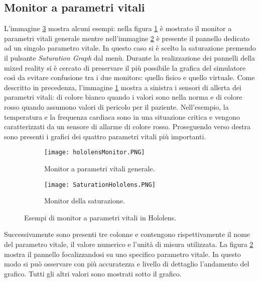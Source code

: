 \subsection{Monitor a parametri vitali}
L'immagine \ref{pic:example-hololens} mostra alcuni esempi: nella figura \ref{pic:monitor-hololens} è mostrato il monitor a parametri vitali generale mentre  nell'immagine \ref{pic:saturation-hololens} è presente il pannello dedicato ad un singolo parametro vitale. In questo caso si è scelto la saturazione premendo il pulsante \textit{Saturation Graph} dal menù. Durante la realizzazione dei pannelli della mixed reality si è cercato di preservare il più possibile la grafica del simulatore così da evitare confusione tra i due monitors: quello fisico e quello virtuale. \newline \newline Come descritto in precedenza, l'immagine \ref{pic:monitor-hololens} mostra a sinistra i sensori di allerta dei parametri vitali: di colore bianco quando i valori sono nella norma e di colore rosso quando assumono valori di pericolo per il paziente. Nell'esempio, la temperatura e la frequenza cardiaca sono in una situazione critica e vengono caratterizzati da un sensore di allarme di colore rosso. Proseguendo verso destra sono presenti i grafici dei quattro parametri vitali più importanti.
\begin{figure}
     \centering
     \begin{subfigure}[b]{0.8\textwidth}
         \centering
         \texttt{[image: hololensMonitor.PNG]}
         \caption{Monitor a parametri vitali generale.}
         \label{pic:monitor-hololens}
     \end{subfigure}
     \hfill
     \begin{subfigure}[b]{0.8\textwidth}
         \centering
         \texttt{[image: SaturationHololens.PNG]}
         \caption{Monitor della saturazione.}
         \label{pic:saturation-hololens}
     \end{subfigure}
     \hfill
        \caption{Esempi di monitor a parametri vitali in Hololens.}
        \label{pic:example-hololens}
\end{figure}
Successivamente sono presenti tre colonne e contengono rispettivamente il nome del parametro vitale, il valore numerico e l'unità di misura utilizzata. \newline \newline La figura \ref{pic:saturation-hololens} mostra il pannello focalizzandosi su uno specifico parametro vitale. In questo modo si può osservare con più accuratezza e livello di dettaglio l'andamento del grafico. Tutti gli altri valori sono mostrati sotto il grafico.

